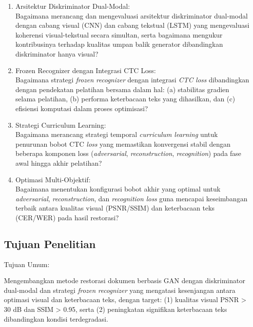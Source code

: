 \documentclass[12pt,a4paper]{article}
\begin{document}
\begin{enumerate}[leftmargin=1.5em, labelsep=0.5em, itemindent=0pt, noitemsep, topsep=0pt]
      \item Arsitektur Diskriminator Dual-Modal: \\
            Bagaimana merancang dan mengevaluasi arsitektur diskriminator dual-modal dengan cabang visual (CNN) dan cabang tekstual (LSTM) yang mengevaluasi koherensi visual-tekstual secara simultan, serta bagaimana mengukur kontribusinya terhadap kualitas umpan balik generator dibandingkan diskriminator hanya visual?

      \item Frozen Recognizer dengan Integrasi CTC Loss: \\
            Bagaimana strategi \textit{frozen recognizer} dengan integrasi \textit{CTC loss} dibandingkan dengan pendekatan pelatihan bersama dalam hal: (a) stabilitas gradien selama pelatihan, (b) performa keterbacaan teks yang dihasilkan, dan (c) efisiensi komputasi dalam proses optimisasi?

      \item Strategi Curriculum Learning: \\
            Bagaimana merancang strategi temporal \textit{curriculum learning} untuk penurunan bobot CTC \textit{loss} yang memastikan konvergensi stabil dengan beberapa komponen loss (\textit{adversarial}, \textit{reconstruction}, \textit{recognition}) pada fase awal hingga akhir pelatihan?

      \item Optimasi Multi-Objektif: \\
            Bagaimana menentukan konfigurasi bobot akhir yang optimal untuk \textit{adversarial}, \textit{reconstruction}, dan \textit{recognition loss} guna mencapai keseimbangan terbaik antara kualitas visual (PSNR/SSIM) dan keterbacaan teks (CER/WER) pada hasil restorasi?
\end{enumerate}

\subsection{Tujuan Penelitian}
\label{subsec:tujuan-penelitian}

Tujuan Umum:

Mengembangkan metode restorasi dokumen berbasis GAN dengan diskriminator dual-modal dan strategi \textit{frozen recognizer} yang mengatasi kesenjangan antara optimasi visual dan keterbacaan teks, dengan target: (1) kualitas visual PSNR > 30 dB dan SSIM > 0.95, serta (2) peningkatan signifikan keterbacaan teks dibandingkan kondisi terdegradasi.
\end{document}

